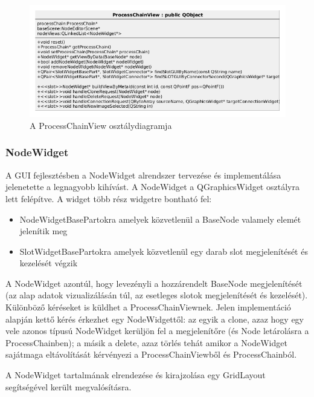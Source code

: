 \documentclass[a4paper,12pt,oneside]{report}
\begin{document}
\begin{center}
\begin{figure}[h]
  \includegraphics[width=1\textwidth]{processcahinview.png}
  \caption{A ProcessChainView osztálydiagramja}

  \label{fig:bimg_processchainview}
\end{figure}
\end{center}

\subsubsection{NodeWidget}
A GUI fejlesztésben a NodeWidget alrendszer tervezése és implementálása jelenetette a legnagyobb kihívást. A NodeWidget a QGraphicsWidget osztályra lett felépítve. A widget több rész widgetre bontható fel:
\begin{itemize}
	\itemsep0em
	\item NodeWidgetBasePartokra amelyek közvetlenül a BaseNode valamely elemét jelenítik meg
	\item SlotWidgetBasePartokra amelyek közvetlenül egy darab slot megjelenítését és kezelését végzik
\end{itemize}
A NodeWidget azontúl, hogy levezényli a hozzárendelt BaseNode megjelenítését (az alap adatok vizualizálásán túl, az esetleges slotok megjelenítését és kezelését). Különböző kéréseket is küldhet a ProcessChainViewnek. Jelen implementáció alapján kettő kérés érkezhet egy NodeWidgettől: az egyik a clone, azaz hogy egy vele azonos típusú NodeWidget kerüljön fel a megjelenítőre (és Node letárolásra a ProcessChainben); a másik a delete, azaz törlés tehát amikor a NodeWidget sajátmaga eltávolítását kérvényezi a ProcessChainViewből és ProcessChainból.

A NodeWidget tartalmának elrendezése és kirajzolása egy GridLayout segítségével került megvalósításra.
\end{document}
